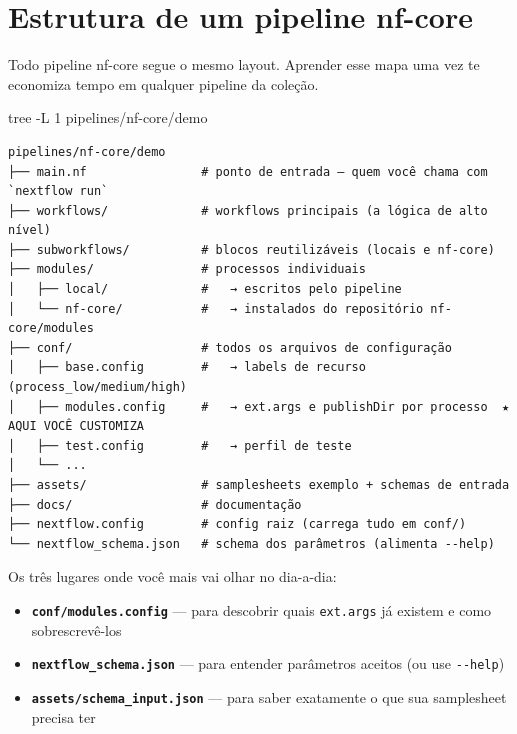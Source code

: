 \documentclass[
  brazilian,
  letterpaper,
  DIV=11,
  numbers=noendperiod]{scrreprt}
\newenvironment{Shaded}{\begin{snugshade}}{\end{snugshade}}
\newcommand{\AttributeTok}[1]{\textcolor[rgb]{0.40,0.45,0.13}{#1}}
\newcommand{\ExtensionTok}[1]{\textcolor[rgb]{0.00,0.23,0.31}{#1}}
\newcommand{\NormalTok}[1]{\textcolor[rgb]{0.00,0.23,0.31}{#1}}
\providecommand{\tightlist}{%
  \setlength{\itemsep}{0pt}\setlength{\parskip}{0pt}}
\begin{document}
\section{Estrutura de um pipeline
nf-core}\label{estrutura-de-um-pipeline-nf-core}

Todo pipeline nf-core segue o mesmo layout. Aprender esse mapa uma vez
te economiza tempo em qualquer pipeline da coleção.

\begin{Shaded}
\begin{Highlighting}[]
\ExtensionTok{tree} \AttributeTok{{-}L}\NormalTok{ 1 pipelines/nf{-}core/demo}
\end{Highlighting}
\end{Shaded}

\begin{verbatim}
pipelines/nf-core/demo
├── main.nf                # ponto de entrada — quem você chama com `nextflow run`
├── workflows/             # workflows principais (a lógica de alto nível)
├── subworkflows/          # blocos reutilizáveis (locais e nf-core)
├── modules/               # processos individuais
│   ├── local/             #   → escritos pelo pipeline
│   └── nf-core/           #   → instalados do repositório nf-core/modules
├── conf/                  # todos os arquivos de configuração
│   ├── base.config        #   → labels de recurso (process_low/medium/high)
│   ├── modules.config     #   → ext.args e publishDir por processo  ★ AQUI VOCÊ CUSTOMIZA
│   ├── test.config        #   → perfil de teste
│   └── ...
├── assets/                # samplesheets exemplo + schemas de entrada
├── docs/                  # documentação
├── nextflow.config        # config raiz (carrega tudo em conf/)
└── nextflow_schema.json   # schema dos parâmetros (alimenta --help)
\end{verbatim}

Os três lugares onde você mais vai olhar no dia-a-dia:

\begin{itemize}
\tightlist
\item
  \textbf{\texttt{conf/modules.config}} --- para descobrir quais
  \texttt{ext.args} já existem e como sobrescrevê-los
\item
  \textbf{\texttt{nextflow\_schema.json}} --- para entender parâmetros
  aceitos (ou use \texttt{-\/-help})
\item
  \textbf{\texttt{assets/schema\_input.json}} --- para saber exatamente
  o que sua samplesheet precisa ter
\end{itemize}
\end{document}
